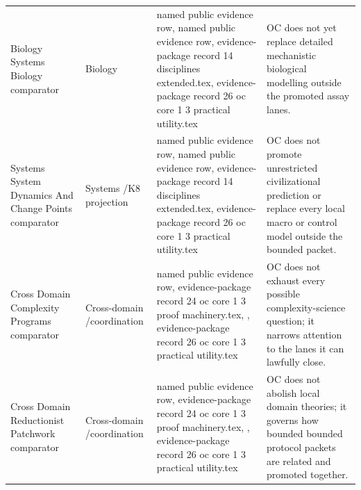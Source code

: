 \begin{longtable}{@{}L{0.20\textwidth}L{0.11\textwidth}L{0.33\textwidth}L{0.28\textwidth}@{}}
Biology Systems Biology comparator & Biology & named public evidence row, named public evidence row, \allowbreak evidence-package record 14 disciplines extended.tex, \allowbreak evidence-package record 26 oc core 1 3 practical utility.tex & OC does not yet replace detailed mechanistic biological modelling outside the promoted assay lanes. \\
Systems System Dynamics And Change Points comparator & Systems /\allowbreak K8 projection & named public evidence row, named public evidence row, \allowbreak evidence-package record 14 disciplines extended.tex, \allowbreak evidence-package record 26 oc core 1 3 practical utility.tex & OC does not promote unrestricted civilizational prediction or replace every local macro or control model outside the bounded packet. \\
Cross Domain Complexity Programs comparator & Cross-domain /\allowbreak coordination & named public evidence row, \allowbreak evidence-package record 24 oc core 1 3 proof machinery.tex, \allowbreak {}, \allowbreak evidence-package record 26 oc core 1 3 practical utility.tex & OC does not exhaust every possible complexity-science question; it narrows attention to the lanes it can lawfully close. \\
Cross Domain Reductionist Patchwork comparator & Cross-domain /\allowbreak coordination & named public evidence row, \allowbreak evidence-package record 24 oc core 1 3 proof machinery.tex, \allowbreak {}, \allowbreak evidence-package record 26 oc core 1 3 practical utility.tex & OC does not abolish local domain theories; it governs how bounded bounded protocol packets are related and promoted together. \\
\bottomrule
\end{longtable}

